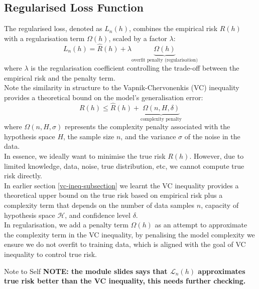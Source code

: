 \subsection*{Regularised Loss Function}
The regularised loss, denoted as \( L_n(h) \), combines the empirical risk \( \hat{R}(h) \) with a regularisation term \( \Omega(h) \), scaled by a factor \( \lambda \):
\begin{equation}
  L_n(h) = \hat{R}(h) + \lambda \underbrace{\Omega(h)}_{\text{overfit penalty (regularisation)}}
\end{equation}
where \( \lambda \) is the regularisation coefficient controlling the trade-off between the empirical risk and the penalty term.\\

Note the similarity in structure to the Vapnik-Chervonenkis (VC) inequality provides a theoretical bound on the model's generalisation error:
\begin{equation}
  R(h) \leq \hat{R}(h) + \underbrace{\Omega(n, H, \delta)}_{\text{complexity penalty}}
\end{equation}
where \( \Omega(n, H, \sigma) \) represents the complexity penalty associated with the hypothesis space \( H \), the sample size \( n \), and the variance \( \sigma \) of the noise in the data.\\

In essence, we ideally want to minimise the true risk $R(h)$. However, due to limited knowledge, data, noise, true distribution, etc, we cannot compute true risk directly.\\

In earlier section \ref{vc-ineq-subsection} we learnt the VC inequality provides a theoretical upper bound on the true risk based on empirical risk plus a complexity term that depends on the number of data samples $n$, capacity of hypothesis space $\mathcal{H}$, and confidence level $\delta$. \\

In regularisation, we add a penalty term $\Omega (h)$ as an attempt to approximate the complexity term in the VC inequality, by penalising the model complexity we ensure we do not overfit to training data, which is aligned with the goal of VC inequality to control true risk.\\

\begin{commentbox}{Note to Self}
    \textbf{NOTE: the module slides says that $\mathcal{L}_n(h)$ approximates true risk better than the VC inequality, this needs further checking.}
\end{commentbox}


